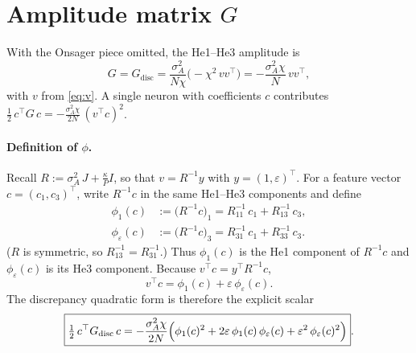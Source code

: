\documentclass[11pt,a4paper]{article}
\begin{document}
\section{Amplitude matrix $G$}

With the Onsager piece omitted, the He1--He3 amplitude is
\begin{equation}
  \boxed{
  G
  =
  G_{\mathrm{disc}}
  =
  \frac{\sigma_A^2}{N\chi}
  \bigl(-\chi^{2}\, v v^\top\bigr)
  =
  -
  \frac{\sigma_A^2\chi}{N}\,
  v v^\top
  },
  \label{eq:G}
\end{equation}
with $v$ from \eqref{eq:v}.
A single neuron with coefficients $c$ contributes
$\tfrac12\,c^\top G\,c=-\tfrac{\sigma_A^2\chi}{2N}\,(v^\top c)^2$.

\paragraph{Definition of $\phi$.}
Recall $R:=\sigma_A^2\, J+\tfrac{\kappa}{P}I$, so that $v=R^{-1}y$ with
$y=(1,\varepsilon)^\top$.
For a feature vector $c=(c_1,c_3)^\top$, write $R^{-1}c$ in the same
He1--He3 components and define
\begin{align}
  \phi_1(c)
  &:=
  \bigl(R^{-1}c\bigr)_1
  =
  R^{-1}_{11}\, c_1
  +
  R^{-1}_{13}\, c_3,
  \label{eq:phi1}\\
  \phi_\varepsilon(c)
  &:=
  \bigl(R^{-1}c\bigr)_3
  =
  R^{-1}_{31}\, c_1
  +
  R^{-1}_{33}\, c_3.
  \label{eq:phie}
\end{align}
($R$ is symmetric, so $R^{-1}_{13}=R^{-1}_{31}$.)
Thus $\phi_1(c)$ is the He1 component of $R^{-1}c$ and
$\phi_\varepsilon(c)$ is its He3 component.
Because $v^\top c=y^\top R^{-1}c$,
\begin{equation}
  v^\top c
  =
  \phi_1(c)
  +
  \varepsilon\,
  \phi_\varepsilon(c).
  \label{eq:v-as-phi}
\end{equation}
The discrepancy quadratic form is therefore the explicit scalar
\begin{equation}
  \boxed{
  \tfrac12\,
  c^\top G_{\mathrm{disc}}\, c
  =
  -
  \frac{\sigma_A^2\chi}{2N}
  \Bigl(
    \phi_1(c)^2
    +
    2\varepsilon\,
    \phi_1(c)\,\phi_\varepsilon(c)
    +
    \varepsilon^2\,
    \phi_\varepsilon(c)^2
  \Bigr)
  }.
  \label{eq:G-disc-phi}
\end{equation}

\end{document}
